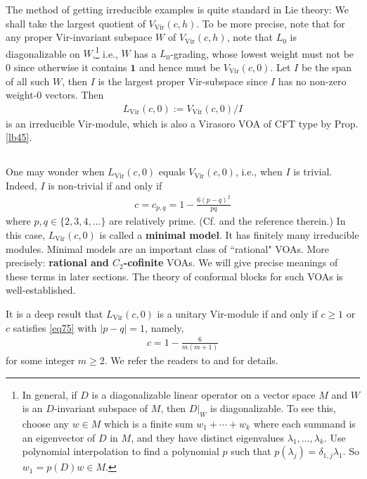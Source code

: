 \documentclass[12pt,a4paper,notitlepage]{article}
\theoremstyle{definition}
\theoremstyle{plain}
\newcommand{\id}{\mathbf{1}}
\newcommand{\Vir}{\mathrm{Vir}}
\numberwithin{equation}{section}
\begin{document}
The method of getting irreducible examples is quite standard in Lie theory: We shall take the largest quotient of $V_\Vir(c,h)$. To be more precise, note that for any proper $\Vir$-invariant subspace $W$ of $V_\Vir(c,h)$, note that $L_0$ is diagonalizable on $W$,\footnote{In general, if $D$ is a diagonalizable linear operator on a vector space $M$ and $W$ is an $D$-invariant subspace of $M$, then $D|_W$ is diagonalizable. To see this, choose any $w\in M$ which is a finite sum $w_1+\cdots +w_k$ where each summand is an eigenvector of $D$ in $M$, and they have distinct eigenvalues $\lambda_1,\dots,\lambda_k$. Use polynomial interpolation to find a polynomial $p$ such that $p(\lambda_j)=\delta_{1,j}\lambda_1$.  So $w_1=p(D)w\in M$.} i.e., $W$ has a $L_0$-grading, whose lowest weight must not be $0$ since otherwise it contains $\id$ and hence must be $V_\Vir(c,0)$. Let $I$ be the span of all such $W$, then $I$ is the largest proper $\Vir$-subspace since $I$ has no non-zero weight-$0$ vectors. Then
\begin{align*}
L_\Vir(c,0):=V_\Vir(c,0)/I
\end{align*}
is an irreducible $\Vir$-module, which is also a Virasoro VOA of CFT type by Prop. \ref{lb45}.

\subsection{}


One may wonder when $L_\Vir(c,0)$ equals $V_\Vir(c,0)$, i.e., when $I$ is trivial. Indeed, $I$ is non-trivial if and only if
\begin{align}
c=c_{p,q}=1-\frac{6(p-q)^2}{pq}	\label{eq75}
\end{align}
where $p,q\in\{2,3,4,\dots\}$ are relatively prime. (Cf. \cite[Rem. 6.1.13]{LL} and the reference therein.) In this case, $L_\Vir(c,0)$ is called a \textbf{minimal model}. It has finitely many irreducible modules. Minimal models are an important class of ``rational" VOAs. More precisely: \textbf{rational and $C_2$-cofinite} VOAs. We will give precise meanings of these terms in later sections. The theory of conformal blocks for such VOAs is well-established.


It is a deep result that $L_\Vir(c,0)$ is a unitary $\Vir$-module if and only if $c\geq1$ or $c$ satisfies \eqref{eq75} with $|p-q|=1$, namely,
\begin{align}
	c=1-\frac 6{m(m+1)}\label{eq130}
\end{align}
for some integer $m\geq2$. We refer the readers to \cite[Chapter 8]{FMS} and \cite[Chapter IV]{Was10} for details.
\end{document}
